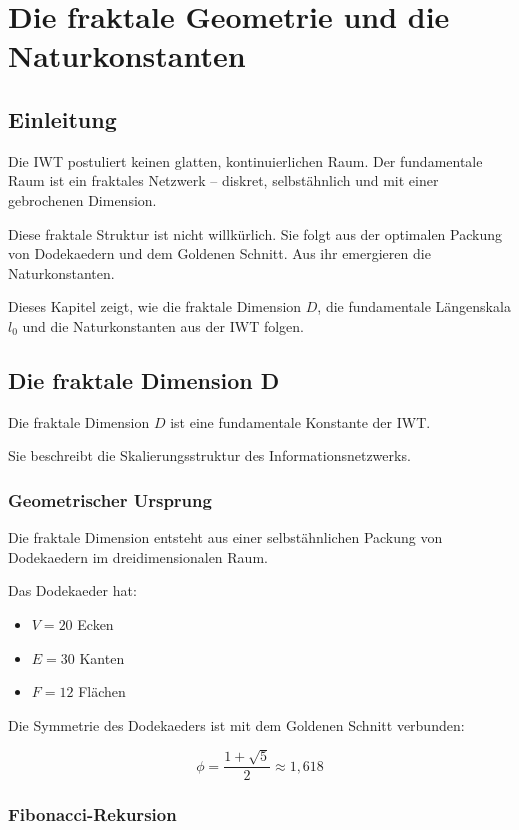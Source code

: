 \chapter{Die fraktale Geometrie und die Naturkonstanten}

\section{Einleitung}

Die IWT postuliert keinen glatten, kontinuierlichen Raum. Der fundamentale Raum ist ein fraktales Netzwerk – diskret, selbstähnlich und mit einer gebrochenen Dimension.

Diese fraktale Struktur ist nicht willkürlich. Sie folgt aus der optimalen Packung von Dodekaedern und dem Goldenen Schnitt. Aus ihr emergieren die Naturkonstanten.

Dieses Kapitel zeigt, wie die fraktale Dimension \( D \), die fundamentale Längenskala \( l_0 \) und die Naturkonstanten aus der IWT folgen.

\section{Die fraktale Dimension D}

Die fraktale Dimension \( D \) ist eine fundamentale Konstante der IWT.

Sie beschreibt die Skalierungsstruktur des Informationsnetzwerks.

\subsection{Geometrischer Ursprung}

Die fraktale Dimension entsteht aus einer selbstähnlichen Packung von Dodekaedern im dreidimensionalen Raum.

Das Dodekaeder hat:
\begin{itemize}
\item \( V = 20 \) Ecken
\item \( E = 30 \) Kanten
\item \( F = 12 \) Flächen
\end{itemize}

Die Symmetrie des Dodekaeders ist mit dem Goldenen Schnitt verbunden:

\[
\phi = \frac{1 + \sqrt{5}}{2} \approx 1,618
\]

\subsection{Fibonacci-Rekursion}

